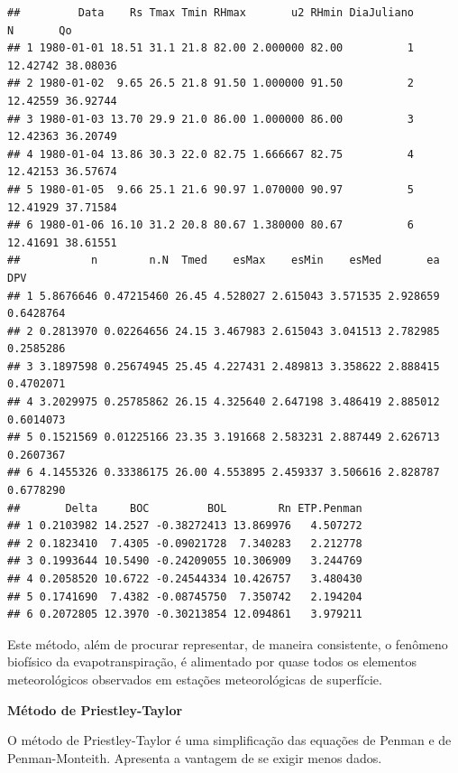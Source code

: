 \documentclass[
]{book}
\newenvironment{Shaded}{\begin{snugshade}}{\end{snugshade}}
\newcommand{\DecValTok}[1]{\textcolor[rgb]{0.00,0.00,0.81}{#1}}
\newcommand{\FloatTok}[1]{\textcolor[rgb]{0.00,0.00,0.81}{#1}}
\newcommand{\KeywordTok}[1]{\textcolor[rgb]{0.13,0.29,0.53}{\textbf{#1}}}
\newcommand{\NormalTok}[1]{#1}
\newcommand{\OperatorTok}[1]{\textcolor[rgb]{0.81,0.36,0.00}{\textbf{#1}}}
\newcommand{\StringTok}[1]{\textcolor[rgb]{0.31,0.60,0.02}{#1}}
\begin{document}
\begin{verbatim}
##         Data    Rs Tmax Tmin RHmax       u2 RHmin DiaJuliano        N       Qo
## 1 1980-01-01 18.51 31.1 21.8 82.00 2.000000 82.00          1 12.42742 38.08036
## 2 1980-01-02  9.65 26.5 21.8 91.50 1.000000 91.50          2 12.42559 36.92744
## 3 1980-01-03 13.70 29.9 21.0 86.00 1.000000 86.00          3 12.42363 36.20749
## 4 1980-01-04 13.86 30.3 22.0 82.75 1.666667 82.75          4 12.42153 36.57674
## 5 1980-01-05  9.66 25.1 21.6 90.97 1.070000 90.97          5 12.41929 37.71584
## 6 1980-01-06 16.10 31.2 20.8 80.67 1.380000 80.67          6 12.41691 38.61551
##           n        n.N  Tmed    esMax    esMin    esMed       ea       DPV
## 1 5.8676646 0.47215460 26.45 4.528027 2.615043 3.571535 2.928659 0.6428764
## 2 0.2813970 0.02264656 24.15 3.467983 2.615043 3.041513 2.782985 0.2585286
## 3 3.1897598 0.25674945 25.45 4.227431 2.489813 3.358622 2.888415 0.4702071
## 4 3.2029975 0.25785862 26.15 4.325640 2.647198 3.486419 2.885012 0.6014073
## 5 0.1521569 0.01225166 23.35 3.191668 2.583231 2.887449 2.626713 0.2607367
## 6 4.1455326 0.33386175 26.00 4.553895 2.459337 3.506616 2.828787 0.6778290
##       Delta     BOC         BOL        Rn ETP.Penman
## 1 0.2103982 14.2527 -0.38272413 13.869976   4.507272
## 2 0.1823410  7.4305 -0.09021728  7.340283   2.212778
## 3 0.1993644 10.5490 -0.24209055 10.306909   3.244769
## 4 0.2058520 10.6722 -0.24544334 10.426757   3.480430
## 5 0.1741690  7.4382 -0.08745750  7.350742   2.194204
## 6 0.2072805 12.3970 -0.30213854 12.094861   3.979211
\end{verbatim}

Este método, além de procurar representar, de maneira consistente, o fenômeno biofísico da evapotranspiração, é alimentado por quase todos os elementos meteorológicos observados em estações meteorológicas de superfície.

\textbf{Método de Priestley-Taylor}

O método de Priestley-Taylor é uma simplificação das equações de Penman e de Penman-Monteith. Apresenta a vantagem de se exigir menos dados.

\begin{Shaded}
\end{Shaded}
\end{document}
